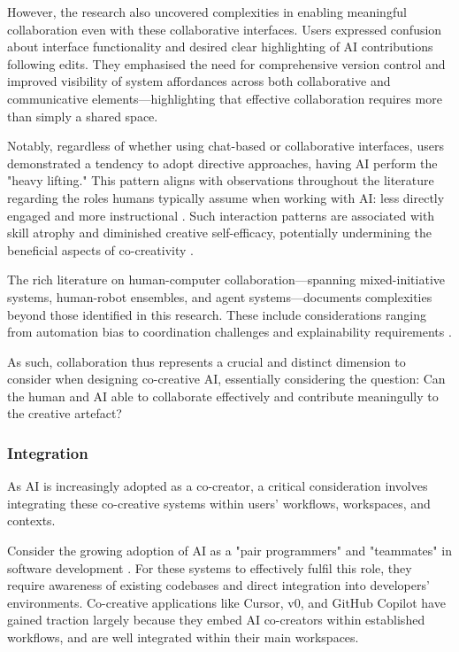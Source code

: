 However, the research also uncovered complexities in enabling meaningful collaboration even with these collaborative interfaces. Users expressed confusion about interface functionality and desired clear highlighting of AI contributions following edits. They emphasised the need for comprehensive version control and improved visibility of system affordances across both collaborative and communicative elements—highlighting that effective collaboration requires more than simply a shared space.

Notably, regardless of whether using chat-based or collaborative interfaces, users demonstrated a tendency to adopt directive approaches, having AI perform the "heavy lifting." This pattern aligns with observations throughout the literature regarding the roles humans typically assume when working with AI: less directly engaged and more instructional \cite{Palani2024-on}. Such interaction patterns are associated with skill atrophy and diminished creative self-efficacy, potentially undermining the beneficial aspects of co-creativity \cite{Lee2025-dw, McGuire2024-im}.

The rich literature on human-computer collaboration—spanning mixed-initiative systems, human-robot ensembles, and agent systems—documents complexities beyond those identified in this research. These include considerations ranging from automation bias to coordination challenges and explainability requirements \cite{Wang2020-cw, Horvitz1999-wh}. 

As such, collaboration thus represents a crucial and distinct dimension to consider when designing co-creative AI, essentially considering the question: Can the human and AI able to collaborate effectively and contribute meaningully to the creative artefact?

\subsubsection{Integration}

As AI is increasingly adopted as a co-creator, a critical consideration involves integrating these co-creative systems within users' workflows, workspaces, and contexts.

Consider the growing adoption of AI as a "pair programmers" and "teammates" in software development \cite{Cursor2024-ow, Ai2025-wi}. For these systems to effectively fulfil this role, they  require awareness of existing codebases and direct integration into developers' environments. Co-creative applications like Cursor, v0, and GitHub Copilot have gained traction largely because they embed AI co-creators within established workflows, and are well integrated within their main workspaces.

